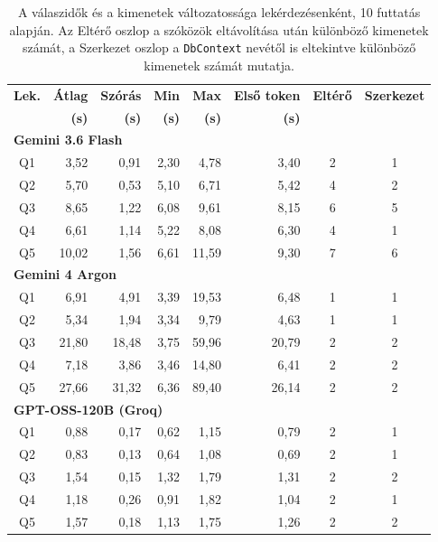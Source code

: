 \begin{table}[H]
	\centering
	\renewcommand{\arraystretch}{1.3}
	\footnotesize
	\begin{tabular}{|c|r|r|r|r|r|c|c|}
		\hline
		\textbf{Lek.} & \textbf{Átlag} & \textbf{Szórás} & \textbf{Min} & \textbf{Max} & \textbf{Első token} & \textbf{Eltérő} & \textbf{Szerkezet} \\
		& \textbf{(s)} & \textbf{(s)} & \textbf{(s)} & \textbf{(s)} & \textbf{(s)} & & \\
		\hline
		\multicolumn{8}{|l|}{\textbf{Gemini 3.6 Flash}} \\
		\hline
		Q1 & 3,52 & 0,91 & 2,30 & 4,78 & 3,40 & 2 & 1 \\
		Q2 & 5,70 & 0,53 & 5,10 & 6,71 & 5,42 & 4 & 2 \\
		Q3 & 8,65 & 1,22 & 6,08 & 9,61 & 8,15 & 6 & 5 \\
		Q4 & 6,61 & 1,14 & 5,22 & 8,08 & 6,30 & 4 & 1 \\
		Q5 & 10,02 & 1,56 & 6,61 & 11,59 & 9,30 & 7 & 6 \\
		\hline
		\multicolumn{8}{|l|}{\textbf{Gemini 4 Argon}} \\
		\hline
		Q1 & 6,91 & 4,91 & 3,39 & 19,53 & 6,48 & 1 & 1 \\
		Q2 & 5,34 & 1,94 & 3,34 & 9,79 & 4,63 & 1 & 1 \\
		Q3 & 21,80 & 18,48 & 3,75 & 59,96 & 20,79 & 2 & 2 \\
		Q4 & 7,18 & 3,86 & 3,46 & 14,80 & 6,41 & 2 & 2 \\
		Q5 & 27,66 & 31,32 & 6,36 & 89,40 & 26,14 & 2 & 2 \\
		\hline
		\multicolumn{8}{|l|}{\textbf{GPT-OSS-120B (Groq)}} \\
		\hline
		Q1 & 0,88 & 0,17 & 0,62 & 1,15 & 0,79 & 2 & 1 \\
		Q2 & 0,83 & 0,13 & 0,64 & 1,08 & 0,69 & 2 & 1 \\
		Q3 & 1,54 & 0,15 & 1,32 & 1,79 & 1,31 & 2 & 2 \\
		Q4 & 1,18 & 0,26 & 0,91 & 1,82 & 1,04 & 2 & 1 \\
		Q5 & 1,57 & 0,18 & 1,13 & 1,75 & 1,26 & 2 & 2 \\
		\hline
	\end{tabular}
	\caption{A válaszidők és a kimenetek változatossága lekérdezésenként, 10 futtatás alapján. Az Eltérő oszlop a szóközök eltávolítása után különböző kimenetek számát, a Szerkezet oszlop a \texttt{DbContext} nevétől is eltekintve különböző kimenetek számát mutatja.}
	\label{tab:llm-comparison}
\end{table}


